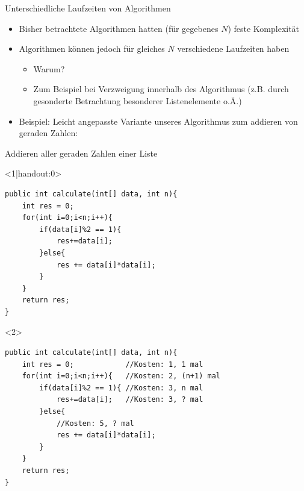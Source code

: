 \begin{frame}{Unterschiedliche Laufzeiten von Algorithmen}
    \begin{itemize}[<+->]
        \item Bisher betrachtete Algorithmen hatten (für gegebenes $N$) feste Komplexität
        \item Algorithmen können jedoch für gleiches $N$ verschiedene Laufzeiten haben
        \begin{itemize}
            \item Warum?
            \item<+-> Zum Beispiel bei Verzweigung innerhalb des Algorithmus (z.B. durch gesonderte Betrachtung besonderer Listenelemente o.Ä.)
        \end{itemize}
        \item Beispiel: Leicht angepasste Variante unseres Algorithmus zum addieren von geraden Zahlen:
    \end{itemize}
\end{frame}

\begin{frame}[fragile]{Addieren aller geraden Zahlen einer Liste}
\lstset{style=java}
\begin{onlyenv}<1|handout:0>
\begin{lstlisting}
public int calculate(int[] data, int n){
    int res = 0;
    for(int i=0;i<n;i++){
        if(data[i]%2 == 1){
            res+=data[i];
        }else{
            res += data[i]*data[i];
        }
    }
    return res;
}
\end{lstlisting}
\end{onlyenv}
\begin{onlyenv}<2>
\begin{lstlisting}
public int calculate(int[] data, int n){
    int res = 0;            //Kosten: 1, 1 mal
    for(int i=0;i<n;i++){   //Kosten: 2, (n+1) mal
        if(data[i]%2 == 1){ //Kosten: 3, n mal
            res+=data[i];   //Kosten: 3, ? mal
        }else{
            //Kosten: 5, ? mal
            res += data[i]*data[i];
        }
    }
    return res;
}
\end{lstlisting}
\end{onlyenv}
\end{frame}

